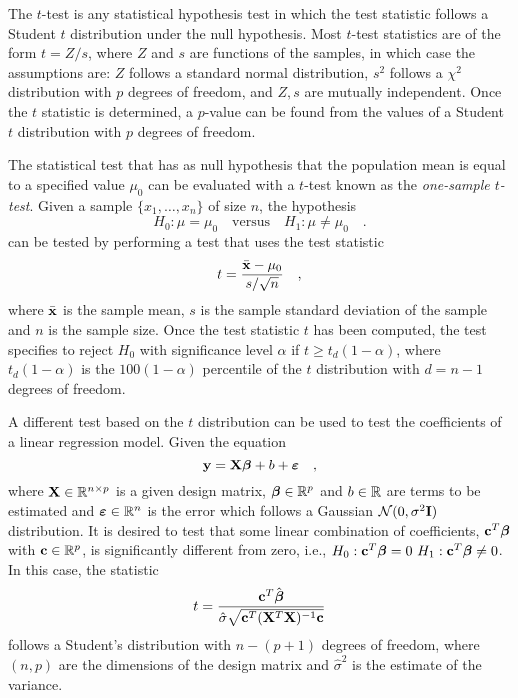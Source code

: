 The $t$-test is any statistical hypothesis test in which the test statistic follows a Student $t$ distribution under the null hypothesis. Most $t$-test statistics are of the form $t=Z/s$, where $Z$ and $s$ are functions of the samples, in which case the assumptions are: $Z$ follows a standard normal distribution, $s^2$ follows a $\chi^2$ distribution with $p$ degrees of freedom, and $Z, s$ are mutually independent. Once the $t$ statistic is determined, a $p$-value can be found from the values of a Student $t$ distribution with $p$ degrees of freedom.


The statistical test that has as null hypothesis that the population mean is equal to a specified value $\mu_0$ can be evaluated with a $t$-test known as the \emph{one-sample $t$-test}. Given a sample $\{x_1, \ldots, x_n\}$ of size $n$, the hypothesis
$$
H_0: \mu = \mu_0 \quad \text{versus} \quad H_1 : \mu \neq \mu_0 \quad.
$$
can be tested by performing a test that uses the test statistic
$$
t = \frac{\bar{\mathbf{x}} - \mu_0}{ s / \sqrt{n}} \quad,
$$
where $\bar{\mathbf{x}}$ is the sample mean, $s$ is the sample standard deviation of the sample and $n$ is the sample size. Once the test statistic $t$ has been computed, the test specifies to reject $H_0$ with significance level $\alpha$ if $t \geq t_d (1 - \alpha)$, where $t_d(1 - \alpha)$ is the $100 (1 - \alpha)$ percentile of the $t$ distribution with $d = n - 1$ degrees of freedom. 

A different test based on the $t$ distribution can be used to test the coefficients of a linear regression model. Given the equation
$$
\mathbf{y} = \mathbf{X}{\boldsymbol \beta} + b + {\boldsymbol \varepsilon} \quad,
$$
where $\mathbf{X} \in {\mathbb R}^{n \times p}$ is a given design matrix, ${\boldsymbol \beta} \in {\mathbb R}^p$ and $b \in {\mathbb R}$ are terms to be estimated and ${\boldsymbol \varepsilon} \in {\mathbb R}^n$ is the error which follows a Gaussian $\mathcal{N}(0, \sigma^2 \mathbf{I})$ distribution. It is desired to test that some linear combination of coefficients, $\mathbf{c}^T {\boldsymbol \beta}$ with $\mathbf{c} \in {\mathbb R}^p$, is significantly different from zero, i.e., $H_0: \mathbf{c}^T {\boldsymbol \beta} = 0 ~ H_1: \mathbf{c}^T {\boldsymbol \beta} \neq 0$. In this case, the statistic
\begin{equation}
t = \frac{\mathbf{c}^T \hat{\bfbeta}}
{\hat{\sigma} \sqrt{\B{c}^T (\B{X}^T \B{X})^{-1} \B{c} }}
\label{Eq:c2_Ttest}
\end{equation}
follows a Student's distribution
with $n - (p + 1)$ degrees of freedom, where $(n, p)$ are the dimensions of the design matrix and $\hat{\sigma}^2$ is the estimate of the variance. 


